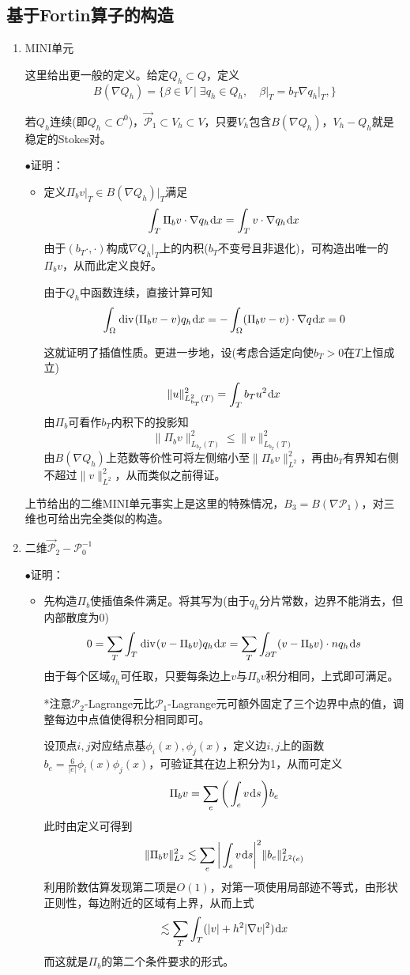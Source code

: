 \documentclass[a4paper,UTF8,fontset=windows]{ctexart}
\newcommand*{\dr}{\hspace{0.07em}\mathrm{d}}
\newcommand*{\cp}{\mathcal{P}}
\renewcommand*{\div}{\hspace{0.07em}\mathrm{div}\hspace{0.07em}}
\newcommand{\proo}[1]{{\kaishu $\bullet$证明：
\begin{itemize}
    \item[] #1
\end{itemize}
}}
\begin{document}
\subsection{基于Fortin算子的构造}
\begin{enumerate}
    \item MINI单元
    
    这里给出更一般的定义。给定$Q_h\subset Q$，定义
    $$B(\nabla Q_h)=\big\{\beta\in V\mid\exists q_h\in Q_h,\quad\beta\big|_T=b_T\nabla q_h\big|_T,\big\}$$

    若$Q_h$连续(即$Q_h\subset C^0$)，$\vec{\cp}_1\subset V_h\subset V$，只要$V_h$包含$B(\nabla Q_h)$，$V_h-Q_h$就是稳定的Stokes对。

    \proo{
        定义$\Pi_bv\big|_T\in B(\nabla Q_h)\big|_T$满足
        $$\int_T\Pi_bv\cdot\nabla q_h\dr x=\int_Tv\cdot\nabla q_h\dr x$$
        由于$(b_T\cdot,\cdot)$构成$\nabla Q_h\big|_T$上的内积($b_T$不变号且非退化)，可构造出唯一的$\Pi_bv$，从而此定义良好。

        由于$Q_h$中函数连续，直接计算可知
        $$\int_\Omega\div(\Pi_bv-v)q_h\dr x=-\int_\Omega(\Pi_bv-v)\cdot\nabla q\dr x=0$$

        这就证明了插值性质。更进一步地，设(考虑合适定向使$b_T>0$在$T$上恒成立)
        $$\|u\|_{L_{b_T}^2(T)}^2=\int_Tb_Tu^2\dr x$$
        由$\Pi_b$可看作$b_T$内积下的投影知
        $$\|\Pi_bv\|_{L_{b_T}(T)}^2\le\|v\|_{L_{b_T}(T)}^2$$
        由$B(\nabla Q_h)$上范数等价性可将左侧缩小至$\|\Pi_bv\|_{L^2}^2$，再由$b_T$有界知右侧不超过$\|v\|_{L^2}^2$，从而类似之前得证。
    }

    上节给出的二维MINI单元事实上是这里的特殊情况，$B_3=B(\nabla\cp_1)$，对三维也可给出完全类似的构造。

    \item 二维$\vec{\cp}_2-\cp_0^{-1}$
    
    \proo{
        先构造$\Pi_b$使插值条件满足。将其写为(由于$q_h$分片常数，边界不能消去，但内部散度为0)
        $$0=\sum_T\int_T\div(v-\Pi_bv)q_h\dr x=\sum_T\int_{\partial T}(v-\Pi_bv)\cdot nq_h\dr s$$
        由于每个区域$q_h$可任取，只要每条边上$v$与$\Pi_bv$积分相同，上式即可满足。

        *注意$\cp_2$-Lagrange元比$\cp_1$-Lagrange元可额外固定了三个边界中点的值，调整每边中点值使得积分相同即可。

        设顶点$i,j$对应结点基$\phi_i(x),\phi_j(x)$，定义边$i,j$上的函数$b_e=\frac{6}{|e|}\phi_i(x)\phi_j(x)$，可验证其在边上积分为1，从而可定义
        $$\Pi_bv=\sum_e\bigg(\int_ev\dr s\bigg)b_e$$
        此时由定义可得到
        $$\|\Pi_bv\|_{L^2}^2\lesssim\sum_e\bigg|\int_ev\dr s\bigg|^2\|b_e\|_{L^2(e)}^2$$
        利用阶数估算发现第二项是$O(1)$，对第一项使用局部迹不等式，由形状正则性，每边附近的区域有上界，从而上式
        $$\lesssim\sum_T\int_T(|v|+h^2|\nabla v|^2)\dr x$$
        而这就是$\Pi_b$的第二个条件要求的形式。
    }


\end{enumerate}
\end{document}
